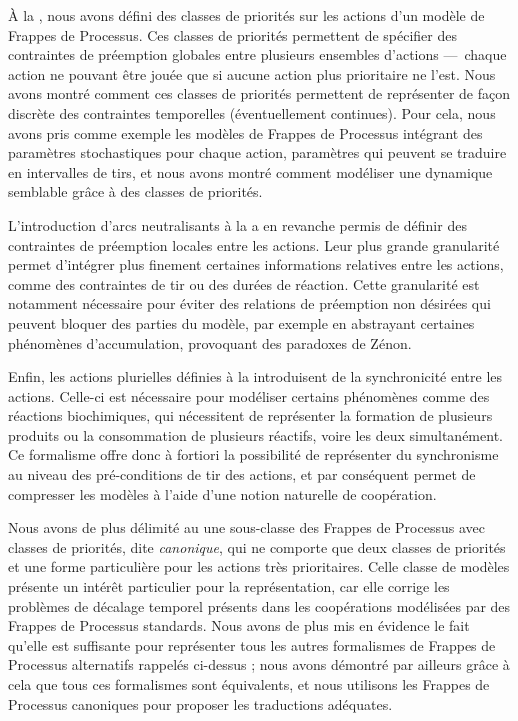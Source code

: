 À la , nous avons défini des classes de priorités sur les actions
d'un modèle de Frappes de Processus.
Ces classes de priorités permettent de spécifier des contraintes de préemption globales
entre plusieurs ensembles d'actions ---~chaque action ne pouvant être jouée que si
aucune action plus prioritaire ne l'est.
Nous avons montré comment ces classes de priorités permettent de représenter de façon
discrète des contraintes temporelles (éventuellement continues).
Pour cela, nous avons pris comme exemple les modèles de Frappes de Processus intégrant
des paramètres stochastiques pour chaque action,
paramètres qui peuvent se traduire en intervalles de tirs,
et nous avons montré comment modéliser une dynamique semblable grâce à des classes de priorités.

L'introduction d'arcs neutralisants à la  a en revanche permis de définir
des contraintes de préemption locales entre les actions.
Leur plus grande granularité permet d'intégrer plus finement certaines informations
relatives entre les actions, comme des contraintes de tir ou des durées de réaction.
Cette granularité est notamment nécessaire pour éviter des relations de préemption
non désirées qui peuvent bloquer des parties du modèle,
par exemple en abstrayant certaines phénomènes d'accumulation,
provoquant des paradoxes de Zénon.

Enfin, les actions plurielles définies à la  introduisent de la
synchronicité entre les actions.
Celle-ci est nécessaire pour modéliser certains phénomènes comme des réactions biochimiques,
qui nécessitent de représenter la formation de plusieurs produits ou la consommation de plusieurs
réactifs, voire les deux simultanément.
Ce formalisme offre donc à fortiori la possibilité de représenter du synchronisme au niveau des
pré-conditions de tir des actions, et par conséquent permet de compresser les modèles
à l'aide d'une notion naturelle de coopération.

\myskip

Nous avons de plus délimité au  une sous-classe des Frappes de Processus
avec classes de priorités, dite \emph{canonique},
qui ne comporte que deux classes de priorités et une forme particulière pour les actions
très prioritaires.
Celle classe de modèles présente un intérêt particulier pour la représentation,
car elle corrige les problèmes de décalage temporel présents
dans les coopérations modélisées par des Frappes de Processus standards.
Nous avons de plus mis en évidence le fait qu'elle est suffisante pour représenter tous
les autres formalismes de Frappes de Processus alternatifs rappelés ci-dessus ;
nous avons démontré par ailleurs grâce à cela que tous ces formalismes sont équivalents,
et nous utilisons les Frappes de Processus canoniques pour proposer
les traductions adéquates.

